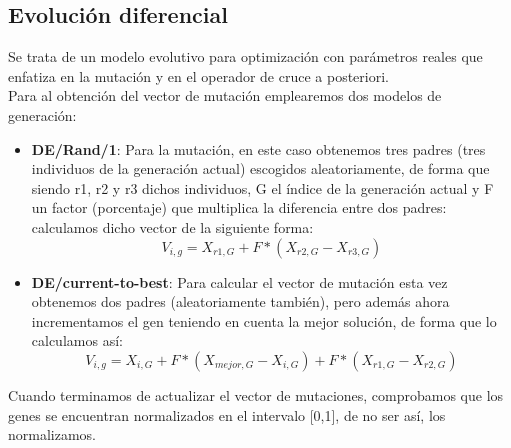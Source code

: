 \subsection{Evolución diferencial}
Se trata de un modelo evolutivo para optimización con parámetros reales que enfatiza en la mutación y en el operador de cruce a posteriori.\\ 
Para al obtención del vector de mutación emplearemos dos modelos de generación:

\begin{itemize}
	\item \textbf{DE/Rand/1}: Para la mutación, en este caso obtenemos tres padres (tres individuos de la generación actual) escogidos aleatoriamente, de forma que siendo r1, r2 y r3 dichos individuos, G el índice de la generación actual y F un factor (porcentaje) que multiplica la diferencia entre dos padres:
	calculamos dicho vector de la siguiente forma:
	\[
	V_{i,g}=X_{r1, G}+F*(X_{r2,G}-X_{r3,G})
	\]
	
	\item \textbf{DE/current-to-best}: Para calcular el vector de mutación esta vez obtenemos dos padres (aleatoriamente también), pero además ahora incrementamos el gen teniendo en cuenta la mejor solución, de forma que lo calculamos así:
	\[
	V_{i,g}=X_{i, G}+F*(X_{mejor,G}-X_{i,G})+ F*(X_{r1,G}-X_{r2,G})
	\]
\end{itemize}

Cuando terminamos de actualizar el vector de mutaciones, comprobamos que los genes se encuentran normalizados en el intervalo [0,1], de no ser así, los normalizamos.\\ 

